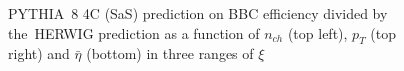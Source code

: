 \begin{figure}[h!]
\begin{subfigure}{.45\textwidth}
	\end{subfigure}
	\begin{minipage}{.45\textwidth}
		\caption[PYTHIA~8 4C (SaS) prediction on BBC efficiency  divided by the~HERWIG prediction as a function of $n_{ch}$, $p_T$ and $\bar{\eta}$ in three ranges of $\xi$]{PYTHIA~8 4C (SaS) prediction on BBC efficiency  divided by the~HERWIG prediction as a function of $n_{ch}$ (top left), $p_T$ (top right) and $\bar{\eta}$ (bottom) in three ranges of $\xi$}
		\label{fig:bbcCorection_syst}
	\end{minipage}
	
\end{figure}

\captionsetup{format=default,indention=0pt,justification=justified}
\FloatBarrier